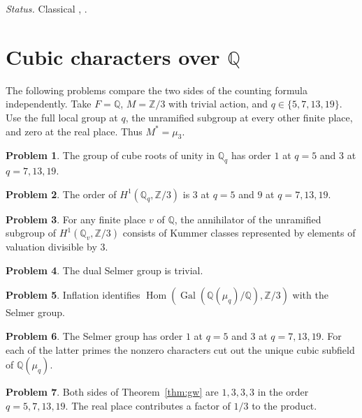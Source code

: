 \documentclass[reqno]{amsart}
\theoremstyle{definition}
\newtheorem{problem}{Problem}[section]
\theoremstyle{plain}
\newcommand{\Q}{\mathbb Q}
\newcommand{\Z}{\mathbb Z}
\begin{document}
\emph{Status.} Classical \cite[Ch.~VIII, Thm.~4.2]{CFT},
\cite[(7.2.13)]{NSW}.

\section{Cubic characters over \texorpdfstring{\(\Q\)}{Q}}\label{sec:cubic}

The following problems compare the two sides of the counting formula
independently.  Take \(F=\Q\), \(M=\Z/3\) with trivial action, and
\(q\in\{5,7,13,19\}\).  Use the full local group at \(q\), the
unramified subgroup at every other finite place, and zero at the real
place.  Thus \(M^*=\mu_3\).

\begin{problem}\label{pr:cubic-invariants}
The group of cube roots of unity in \(\Q_q\) has order \(1\) at \(q=5\)
and \(3\) at \(q=7,13,19\).
\end{problem}

\begin{problem}\label{pr:cubic-local}
The order of \(H^1(\Q_q,\Z/3)\) is \(3\) at \(q=5\) and \(9\) at
\(q=7,13,19\).
\end{problem}

\begin{problem}\label{pr:cubic-unramified}
For any finite place \(v\) of \(\Q\), the annihilator of the
unramified subgroup of \(H^1(\Q_v,\Z/3)\) consists of Kummer
classes represented by elements of valuation divisible by \(3\).
\end{problem}

\begin{problem}\label{pr:cubic-dual}
The dual Selmer group is trivial.
\end{problem}

\begin{problem}\label{pr:cubic-conductor}
Inflation identifies
\(\operatorname{Hom}(\operatorname{Gal}(\Q(\mu_q)/\Q),\Z/3)\)
with the Selmer group.
\end{problem}

\begin{problem}\label{pr:cubic-global}
The Selmer group has order \(1\) at \(q=5\) and \(3\) at \(q=7,13,19\).
For each of the latter primes the nonzero characters cut out the unique
cubic subfield of \(\Q(\mu_q)\).
\end{problem}

\begin{problem}\label{pr:cubic-ratio}
Both sides of Theorem~\ref{thm:gw} are \(1,3,3,3\) in the order
\(q=5,7,13,19\).  The real place contributes a factor of \(1/3\) to the
product.
\end{problem}
\end{document}
